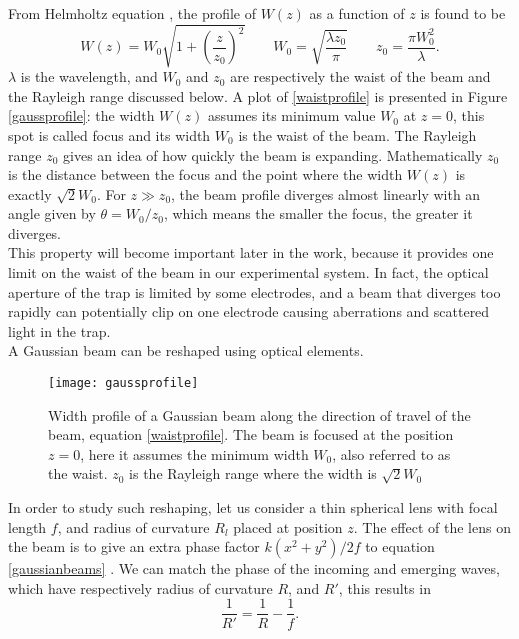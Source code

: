 From Helmholtz equation \cite{saleh}, the profile of $W(z)$ as a function of $z$ is found to be
\begin{equation}
\label{waistprofile}
W(z) = W_0 \sqrt{1 + \left(\frac{z}{z_0}\right)^2}\qquad W_0 = \sqrt{\frac{\lambda z_0}{\pi}} \qquad z_0 = \frac{\pi W_0^2}{\lambda}.
\end{equation}
$\lambda$ is the wavelength, and $W_0$ and $z_0$ are respectively the waist of the beam and the Rayleigh range discussed below. A plot of \eqref{waistprofile} is presented in Figure \eqref{gaussprofile}:
the width $W(z)$ assumes its minimum value $W_0$ at $z=0$, this spot is called focus and its width $W_0$ is the waist of the beam. The Rayleigh range $z_0$ gives an idea of how quickly the beam is expanding. Mathematically $z_0$ is the distance between the focus and the point where the width $W(z)$ is exactly $\sqrt{2}W_0$.
For $z \gg z_0$, the beam profile diverges almost linearly with an angle given by $\theta = W_0/z_0$, which means the smaller the focus, the greater it diverges.\\
This property will become important later in the work, because it provides one limit on the waist of the beam in our experimental system. In fact, the optical aperture of the trap is limited by some electrodes, and a beam that diverges too rapidly can potentially clip on one electrode causing aberrations and scattered light in the trap.\\
A Gaussian beam can be reshaped using optical elements.
\begin{figure}
\centering
\texttt{[image: gaussprofile]}
\caption{Width profile of a Gaussian beam along the direction of travel of the beam, equation \eqref{waistprofile}. The beam is focused at the position $z = 0$, here it assumes the minimum width $W_0$, also referred to as the waist. $z_0$ is the Rayleigh range where the width is $\sqrt{2}W_0$}
\label{gaussprofile}
\end{figure}
In order to study such reshaping, let us consider a thin spherical lens with focal length $f$, and radius of curvature $R_l$ placed at position $z$. The effect of the lens on the beam is to give an extra phase factor $k(x^2 + y^2)/2f$ to equation \eqref{gaussianbeams} \cite{beamparameters}. We can match the phase of the incoming and emerging waves, which have respectively radius of curvature $R$, and $R'$, this results in
\begin{equation}
\frac{1}{R'} = \frac{1}{R} - \frac{1}{f}.
\end{equation}
